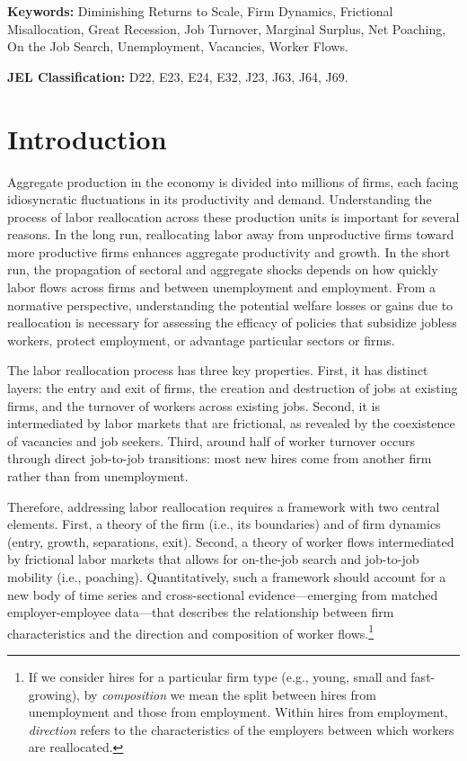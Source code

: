 \vspace*{1.cm}

\noindent \textbf{Keywords:} Diminishing Returns to Scale, Firm Dynamics, Frictional Misallocation, Great Recession, Job Turnover, Marginal Surplus, Net Poaching, On the Job Search, Unemployment, Vacancies,
Worker Flows.\vspace*{0.5cm}

\noindent \textbf{JEL Classification:} D22, E23, E24, E32, J23, J63, J64, J69.

\thispagestyle{empty} 
\newpage \addtocounter{page}{-1}


\section{Introduction}

\sloppy \label{sec:introduction}

Aggregate production in the economy is divided into millions of firms, each facing idiosyncratic fluctuations in its productivity and demand.
Understanding the process of labor reallocation across these production units is important for several reasons.
In the long run, reallocating labor away from unproductive firms toward more productive firms enhances aggregate productivity and growth.
In the short run, the propagation of sectoral and aggregate shocks depends on how quickly labor flows across firms and between unemployment and employment.
From a normative perspective, understanding the potential welfare losses or gains due to reallocation is necessary for assessing the efficacy of policies that subsidize jobless workers, protect employment, or advantage particular sectors or firms.

The labor reallocation process has three key properties.
First, it has distinct layers: the entry and exit of firms, the creation and destruction of jobs at existing firms, and the turnover of workers across existing jobs.
Second, it is intermediated by labor markets that are frictional, as revealed by the coexistence of vacancies and job seekers.
Third, around half of worker turnover occurs through direct job-to-job transitions: most new hires come from another firm rather than from unemployment.

Therefore, addressing labor reallocation requires a framework with two central elements.
First,  a theory of the firm (i.e., its boundaries) and of firm dynamics (entry, growth, separations, exit).
Second, a theory of worker flows intermediated by frictional labor markets that allows for on-the-job search and job-to-job mobility (i.e., poaching).
Quantitatively, such a framework should account for a new body of time series and cross-sectional evidence---emerging from matched employer-employee data---that describes the relationship between firm characteristics and the direction and composition of worker flows.\footnote{
    If we consider hires for a particular firm type (e.g., young, small and fast-growing), by \emph{composition} we mean the split between hires from unemployment and those from employment.
    Within hires from employment, \emph{direction} refers to the characteristics of the employers between which workers are reallocated.}

